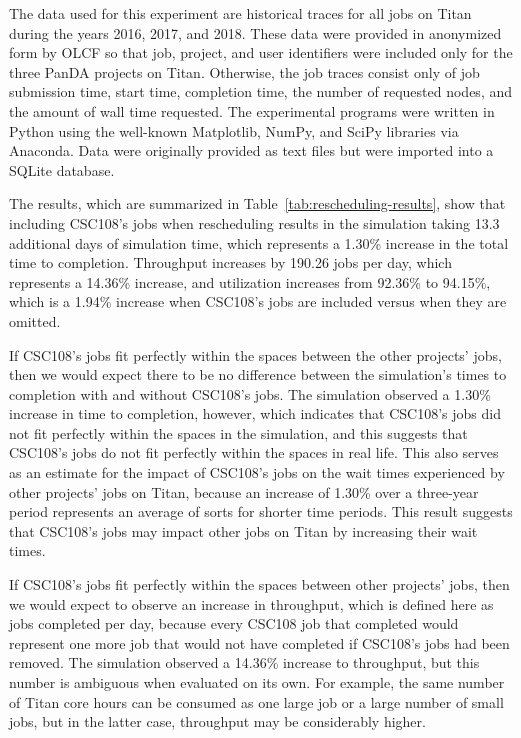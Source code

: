 The data used for this experiment are historical traces for all jobs on Titan
during the years 2016, 2017, and 2018. These data were provided in anonymized
form by OLCF so that job, project, and user identifiers were included only for
the three PanDA projects on Titan. Otherwise, the job traces consist only of
job submission time, start time, completion time, the number of requested
nodes, and the amount of wall time requested. The experimental programs were
written in Python using the well-known Matplotlib, NumPy, and SciPy libraries
via Anaconda. Data were originally provided as text files but were imported
into a SQLite database.



The results, which are summarized in Table~\ref{tab:rescheduling-results}, show
that including CSC108's jobs when rescheduling results in the simulation taking
13.3 additional days of simulation time, which represents a 1.30\% increase in
the total time to completion. Throughput increases by 190.26 jobs per day,
which represents a 14.36\% increase, and utilization increases from 92.36\% to
94.15\%, which is a 1.94\% increase when CSC108's jobs are included versus when
they are omitted.

If CSC108's jobs fit perfectly within the spaces between the other projects'
jobs, then we would expect there to be no difference between the simulation's
times to completion with and without CSC108's jobs. The simulation observed a
1.30\% increase in time to completion, however, which indicates that CSC108's
jobs did not fit perfectly within the spaces in the simulation, and this
suggests that CSC108's jobs do not fit perfectly within the spaces in real
life. This also serves as an estimate for the impact of CSC108's jobs on the
wait times experienced by other projects' jobs on Titan, because an increase of
1.30\% over a three-year period represents an average of sorts for shorter
time periods. This result suggests that CSC108's jobs may impact other jobs on
Titan by increasing their wait times.

If CSC108's jobs fit perfectly within the spaces between other projects' jobs,
then we would expect to observe an increase in throughput, which is defined
here as jobs completed per day, because every CSC108 job that completed would
represent one more job that would not have completed if CSC108's jobs had been
removed. The simulation observed a 14.36\% increase to throughput, but this
number is ambiguous when evaluated on its own. For example, the same number of
Titan core hours can be consumed as one large job or a large number of small
jobs, but in the latter case, throughput may be considerably higher.

